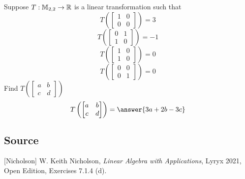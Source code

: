 \documentclass{ximera}
\author{}
\begin{document}
\begin{exercise}
Suppose $T:\mathbb{M}_{2,2}\rightarrow \mathbb{R}$ is a linear transformation such that $$T\left(\begin{bmatrix}1 & 0\\0 & 0\end{bmatrix}\right)=3$$
$$T\left(\begin{bmatrix}0 & 1\\1 & 0\end{bmatrix}\right)=-1$$
$$T\left(\begin{bmatrix}1 & 0\\1 & 0\end{bmatrix}\right)=0$$
$$T\left(\begin{bmatrix}0 & 0\\0 & 1\end{bmatrix}\right)=0$$
Find $T\left(\begin{bmatrix}a & b\\c & d\end{bmatrix}\right)$
$$T\left(\begin{bmatrix}a & b\\c & d\end{bmatrix}\right)=\answer{3a+2b-3c}$$

 \end{exercise}

\subsection*{Source}
[Nicholson] W. Keith Nicholson, {\it Linear Algebra with Applications}, Lyryx 2021, Open Edition, Exercises 7.1.4 (d).  
\end{document}
